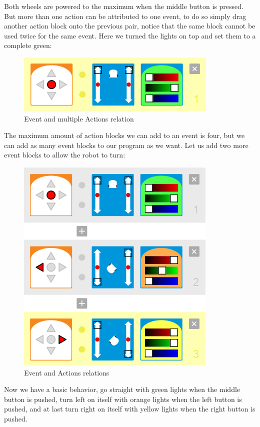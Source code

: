 \documentclass{scrartcl}
\begin{document}
Both wheels are powered to the maximum when the middle button is pressed. But more than one action can be attributed to one event, 
to do so simply drag another action block onto the previous pair, notice that the same block cannot be used twice for the same event. 
Here we turned the lights on top and set them to a complete green:\\
\begin{figure}[h!]
  \centering
  \includegraphics[scale=0.5]{./VPL/middlebtn_forward_green}
  \caption{Event and multiple Actions relation}
  \label{fig:thymio_vpl_middlebtn_1e2a}
\end{figure}

The maximum amount of action blocks we can add to an event is four, but we can add as many event blocks to our program as we want. 
Let us add two more event blocks to allow the robot to turn:\\
\begin{figure}[h!]
  \centering
  \includegraphics[scale=0.5]{./VPL/middlebtn_3E}
  \caption{Event and Actions relations}
  \label{fig:thymio_vpl_middlebtn_3e6a}
\end{figure}

Now we have a basic behavior, go straight with green lights when the middle button is pushed, turn left on itself with orange lights when the left button is pushed, 
and at last turn right on itself with yellow lights when the right button is pushed.\\
\end{document}
